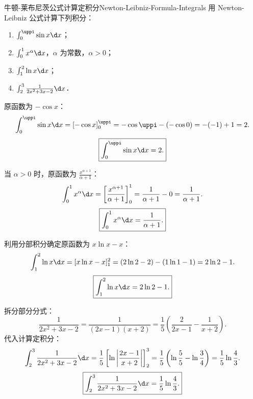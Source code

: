 \begin{problem}{牛顿-莱布尼茨公式计算定积分}{Newton-Leibniz-Formula-Integrals}
    用 Newton-Leibniz 公式计算下列积分：
    \begin{enumerate}
        \item $\int_0^{\uppi} \sin x \d x$；
        \item $\int_0^1 x^\alpha \d x$，$\alpha$ 为常数，$\alpha > 0$；
        \item $\int_1^2 \ln x \d x$；
        \item $\int_2^3 \frac{1}{2x^2 + 3x - 2} \d x$．
    \end{enumerate}
\end{problem}

\begin{solution}

    原函数为 $-\cos x$：
    \begin{equation}
        \int_0^{\uppi} \sin x \d x = [-\cos x]_0^{\uppi} = -\cos\uppi - (-\cos 0) = -(-1) + 1 = 2.
    \end{equation}
    \begin{equation}
        \boxed{\int_0^{\uppi} \sin x \d x = 2.}
    \end{equation}


    当 $\alpha > 0$ 时，原函数为 $\frac{x^{\alpha+1}}{\alpha+1}$：
    \begin{equation}
        \int_0^1 x^\alpha \d x = \left[ \frac{x^{\alpha+1}}{\alpha+1} \right]_0^1 = \frac{1}{\alpha+1} - 0 = \frac{1}{\alpha+1}.
    \end{equation}
    \begin{equation}
        \boxed{\int_0^1 x^\alpha \d x = \frac{1}{\alpha+1}.}
    \end{equation}


    利用分部积分确定原函数为 $x\ln x - x$：
    \begin{equation}
        \int_1^2 \ln x \d x = [x\ln x - x]_1^2 = (2\ln 2 - 2) - (1\ln 1 - 1) = 2\ln 2 - 1.
    \end{equation}
    \begin{equation}
        \boxed{\int_1^2 \ln x \d x = 2\ln 2 - 1.}
    \end{equation}


    拆分部分分式：
    \begin{equation}
        \frac{1}{2x^2 + 3x - 2} = \frac{1}{(2x - 1)(x + 2)} = \frac{1}{5}\left( \frac{2}{2x - 1} - \frac{1}{x + 2} \right).
    \end{equation}
    代入计算定积分：
    \begin{equation}
        \int_2^3 \frac{1}{2x^2 + 3x - 2} \d x = \frac{1}{5}\left[ \ln\left| \frac{2x - 1}{x + 2} \right| \right]_2^3 = \frac{1}{5}\left( \ln\frac{5}{5} - \ln\frac{3}{4} \right) = \frac{1}{5}\ln\frac{4}{3}.
    \end{equation}
    \begin{equation}
        \boxed{\int_2^3 \frac{1}{2x^2 + 3x - 2} \d x = \frac{1}{5}\ln\frac{4}{3}.}
    \end{equation}
\end{solution}

